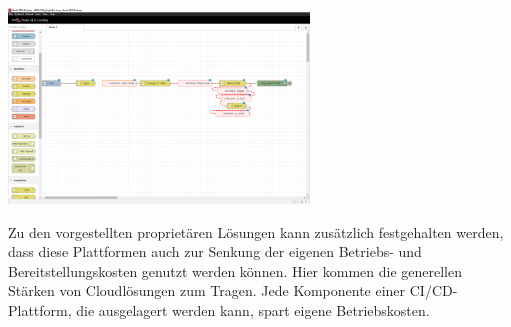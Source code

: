 \begin{center}
    \includegraphics[width=0.6\textwidth]{Grafiken/NodeRed_Flow.png}
    \label{Grafik:Beispielhafter Flow in der NodeRed-Desktopversion}
\end{center}
Zu den vorgestellten proprietären Lösungen kann zusätzlich festgehalten werden, dass diese Plattformen auch zur Senkung der eigenen Betriebs- und Bereitstellungskosten genutzt werden können. Hier kommen die generellen Stärken von Cloudlösungen zum Tragen. Jede Komponente einer \acrshort{CI}/\acrshort{CD}-Plattform, die ausgelagert werden kann, spart eigene Betriebskosten.